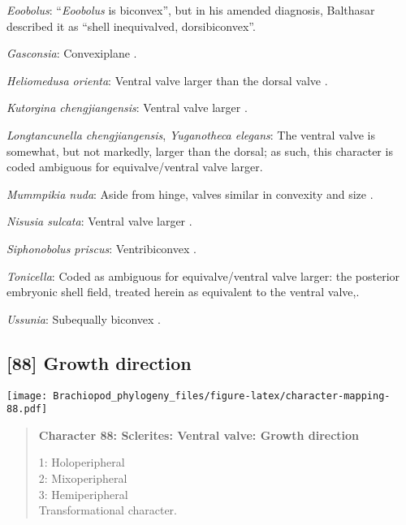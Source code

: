 \documentclass[openany]{book}
\theoremstyle{definition}
\theoremstyle{definition}
\theoremstyle{definition}
\theoremstyle{remark}
\begin{document}
\hypertarget{Eoobolus-coding-87}{}
\emph{Eoobolus}: ``\emph{Eoobolus} is biconvex'', but in his amended
diagnosis, Balthasar \citeyearpar{Balthasar2009Thebrachiopod} described
it as ``shell inequivalved, dorsibiconvex''.

\hypertarget{Gasconsia-coding-87}{}
\emph{Gasconsia}: Convexiplane
\citep[p.~187]{Williams2000LinguliformeaCraniiformea}.

\hypertarget{Heliomedusa_orienta-coding-87}{}
\emph{Heliomedusa orienta}: Ventral valve larger than the dorsal valve
\citep[p.~659]{Zhang2009Architectureand}.

\hypertarget{Kutorgina_chengjiangensis-coding-87}{}
\emph{Kutorgina chengjiangensis}: Ventral valve larger \citep[see][fig.
125.]{Williams2000LinguliformeaCraniiformea}.

\hypertarget{Longtancunella_chengjiangensis-coding-87}{}
\emph{Longtancunella chengjiangensis}, \emph{Yuganotheca elegans}: The
ventral valve is somewhat, but not markedly, larger than the dorsal; as
such, this character is coded ambiguous for equivalve/ventral valve
larger.

\hypertarget{Mummpikia_nuda-coding-87}{}
\emph{Mummpikia nuda}: Aside from hinge, valves similar in convexity and
size \citep{Balthasar2008iMummpikia}.

\hypertarget{Nisusia_sulcata-coding-87}{}
\emph{Nisusia sulcata}: Ventral valve larger \citep[see][fig.
126.]{Williams2000LinguliformeaCraniiformea}.

\hypertarget{Siphonobolus_priscus-coding-87}{}
\emph{Siphonobolus priscus}: Ventribiconvex
\citep{Popov2009Earlyontogeny}.

\hypertarget{Tonicella-coding-87}{}
\emph{Tonicella}: Coded as ambiguous for equivalve/ventral valve larger:
the posterior embryonic shell field, treated herein as equivalent to the
ventral valve,.

\hypertarget{Ussunia-coding-87}{}
\emph{Ussunia}: Subequally biconvex
\citep[p.~192]{Williams2000LinguliformeaCraniiformea}.

\subsection*{{[}88{]} Growth direction}\label{growth-direction-1}

\texttt{[image: Brachiopod\_phylogeny\_files/figure-latex/character-mapping-88.pdf]}

\begin{quote}
\textbf{Character 88: Sclerites: Ventral valve: Growth direction}

1: Holoperipheral\\
2: Mixoperipheral\\
3: Hemiperipheral\\
Transformational character.
\end{quote}
\end{document}
